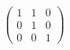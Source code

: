 \documentclass[preview]{standalone}
\begin{document}
\begin{align*}
\begin{pmatrix} 1 & 1 & 0 \\ 0 & 1 & 0 \\ 0 & 0 & 1 \end{pmatrix}
\end{align*}
\end{document}
